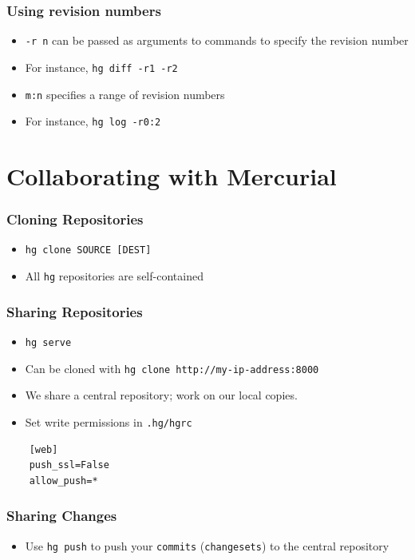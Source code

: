 \documentclass[12pt,compress]{beamer}
\newcommand{\typ}[1]{\lstinline{#1}}
\begin{document}
\begin{frame}[fragile]
  \frametitle{Using revision numbers}
  \begin{itemize}
  \item \typ{-r n} can be passed as arguments to commands to specify
    the revision number
  \item For instance, \typ{hg diff -r1 -r2}
  \item \typ{m:n} specifies a range of revision numbers
  \item For instance, \typ{hg log -r0:2}
  \end{itemize}
\end{frame}

\section{Collaborating with Mercurial}
\begin{frame}[fragile]
  \frametitle{Cloning Repositories}
  \begin{itemize}
  \item \typ{hg clone SOURCE [DEST]}
  \item All \typ{hg} repositories are self-contained
  \end{itemize}
\end{frame}

\begin{frame}[fragile]
  \frametitle{Sharing Repositories}
  \begin{itemize}
  \item \typ{hg serve}
  \item Can be cloned with \typ{hg clone http://my-ip-address:8000}
  \item We share a central repository; work on our local copies. 
  \item Set write permissions in \typ{.hg/hgrc}
  \end{itemize}
  \begin{lstlisting}
    [web]
    push_ssl=False
    allow_push=*
  \end{lstlisting}
\end{frame}

\begin{frame}
  \frametitle{Sharing Changes}
  \begin{itemize}
  \item Use \typ{hg push} to push your \typ{commits}
    (\typ{changesets}) to the central repository
  \end{itemize}
\end{frame}
\end{document}
